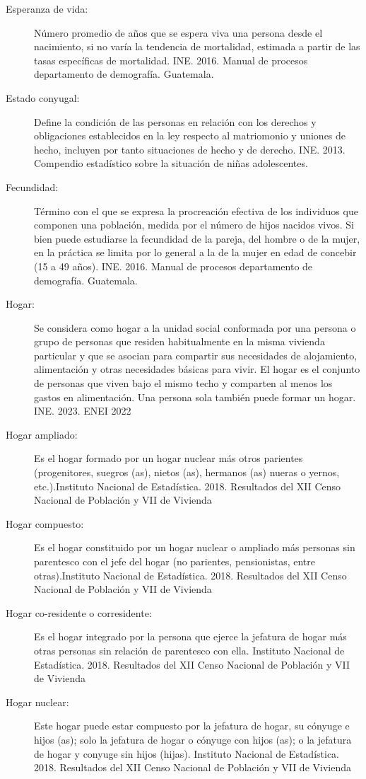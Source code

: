 \begin{description}
	\item [Esperanza de vida:] Número promedio de años que se espera viva una persona desde el nacimiento, si no varía la tendencia de mortalidad, estimada a partir de las tasas específicas de mortalidad. INE. 2016. Manual de procesos departamento de demografía. Guatemala.
	\item[Estado conyugal:] Define la condición de las personas en relación con los derechos y obligaciones establecidos en la ley respecto al matriomonio y uniones de hecho, incluyen por tanto situaciones de hecho y de derecho. INE. 2013.  Compendio estadístico sobre la situación de niñas adolescentes.
	\item[Fecundidad:] Término con el que se expresa la procreación efectiva de los individuos que componen una población, medida por el número de hijos nacidos vivos. Si bien puede estudiarse la fecundidad de la pareja, del hombre o de la mujer, en la práctica se limita por lo general a la de la mujer en edad de concebir (15 a 49 años). INE. 2016. Manual de procesos departamento de demografía. Guatemala.
	\item[Hogar:] Se considera como hogar a la unidad social conformada por una persona o grupo de personas que residen habitualmente en la misma vivienda particular y que se asocian para compartir sus necesidades de alojamiento, alimentación y otras necesidades básicas para vivir. El hogar es el conjunto de personas que viven bajo el mismo techo y comparten al menos los gastos en alimentación. Una persona sola también puede formar un hogar. INE. 2023. ENEI 2022
	\item[Hogar ampliado:] Es el hogar formado por un hogar nuclear más otros parientes (progenitores, suegros (as), nietos (as), hermanos (as) nueras o yernos, etc.).Instituto Nacional de Estadística. 2018. Resultados del XII Censo Nacional de Población y VII de Vivienda
	\item[Hogar compuesto:] Es el hogar constituido por un hogar nuclear o ampliado más personas sin parentesco con el jefe del hogar (no parientes, pensionistas, entre otras).Instituto Nacional de Estadística. 2018. Resultados del XII Censo Nacional de Población y VII de Vivienda
	\item[Hogar co-residente o corresidente:] Es el hogar integrado por la persona que ejerce la jefatura de hogar más otras personas sin relación de parentesco con ella. Instituto Nacional de Estadística. 2018. Resultados del XII Censo Nacional de Población y VII de Vivienda
	\item[Hogar nuclear:] Este hogar puede estar compuesto por la jefatura de hogar, su cónyuge e hijos (as); solo la jefatura de hogar o cónyuge con hijos (as); o la jefatura de hogar y conyuge sin hijos (hijas). Instituto Nacional de Estadística. 2018. Resultados del XII Censo Nacional de Población y VII de Vivienda

\end{description}
